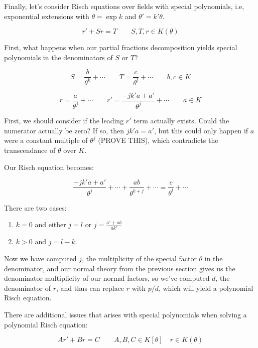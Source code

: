 Finally, let's consider Risch equations over fields
with special polynomials, i.e, exponential extensions
with $\theta = \exp k$ and $\theta' = k' \theta$.

$$r' + S r = T \qquad S,T,r \in K(\theta)$$

First, what happens when our partial
fractions decomposition yields special polynomials
in the denominators of $S$ or $T$?

$$S = \frac{b}{\theta^k} + \cdots \qquad T = \frac{c}{\theta^l} + \cdots \qquad b,c \in K$$




$$r = \frac{a}{\theta^j} + \cdots  \qquad  r' = \frac{-j k' a + a'}{\theta^{j}} + \cdots \qquad a \in K$$

First, we should consider if the leading $r'$ term actually exists.
Could the numerator actually be zero?  If so, then $j k' a = a'$,
but this could only happen if $a$ were a constant
multiple of $\theta^j$ (PROVE THIS), which contradicts the
transcendance of $\theta$ over $K$.

Our Risch equation becomes:

$$\frac{-j k' a + a'}{\theta^{j}} + \cdots + \frac{a b }{\theta^{k+j}} + \cdots
= \frac{c}{\theta^l} + \cdots$$

There are two cases:

\begin{enumerate}
\item $k=0$ and either $j=l$ or
$j = \frac{a' + a b}{a k'}$
\item $k>0$ and $j=l-k$.
\end{enumerate}

Now we have computed $j$, the multiplicity of the special factor
$\theta$ in the
denominator, and our normal theory from the previous section gives us
the denominator multiplicity of our normal factors, so
we've computed $d$, the denominator of $r$, and
thus can replace $r$ with $p/d$, which will
yield a polynomial Risch equation.

There are additional issues that arises with special polynomials when
solving a polynomial Risch equation:

\begin{equation}
\label{eq: special polynomial Risch}
A r' + B r = C \qquad A,B,C \in K[\theta] \quad r \in K(\theta)
\end{equation}

